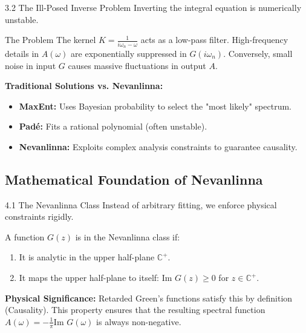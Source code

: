 \documentclass[aspectratio=169, 11pt]{beamer}
\begin{document}
\begin{frame}{3.2 The Ill-Posed Inverse Problem}
    Inverting the integral equation is numerically unstable.
    
    \begin{alertblock}{The Problem}
        The kernel $K = \frac{1}{i\omega_n - \omega}$ acts as a low-pass filter. High-frequency details in $A(\omega)$ are exponentially suppressed in $G(i\omega_n)$. Conversely, small noise in input $G$ causes massive fluctuations in output $A$.
    \end{alertblock}

    \textbf{Traditional Solutions vs. Nevanlinna:}
    \begin{itemize}
        \item \textbf{MaxEnt:} Uses Bayesian probability to select the "most likely" spectrum.
        \item \textbf{Padé:} Fits a rational polynomial (often unstable).
        \item \textbf{Nevanlinna:} Exploits complex analysis constraints to guarantee causality.
    \end{itemize}
\end{frame}

\subsection{Mathematical Foundation of Nevanlinna}

\begin{frame}{4.1 The Nevanlinna Class}
    Instead of arbitrary fitting, we enforce physical constraints rigidly.
    
    \begin{definition}
        A function $G(z)$ is in the Nevanlinna class if:
        \begin{enumerate}
            \item It is analytic in the upper half-plane $\mathbb{C}^+$.
            \item It maps the upper half-plane to itself: $\text{Im } G(z) \ge 0$ for $z \in \mathbb{C}^+$.
        \end{enumerate}
    \end{definition}

    \textbf{Physical Significance:}
    Retarded Green's functions satisfy this by definition (Causality). This property ensures that the resulting spectral function $A(\omega) = -\frac{1}{\pi} \text{Im } G(\omega)$ is always non-negative.
\end{frame}
\end{document}
